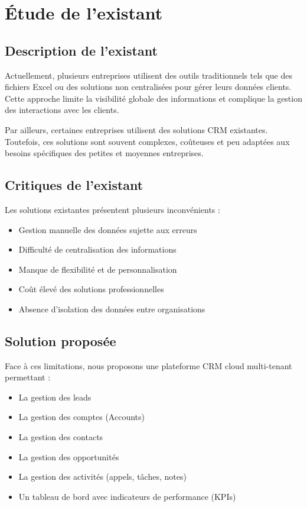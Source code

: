 \documentclass[12pt,a4paper]{report}
\begin{document}
\section{Étude de l’existant}

\subsection{Description de l’existant}

Actuellement, plusieurs entreprises utilisent des outils traditionnels tels que des fichiers Excel ou des solutions non centralisées pour gérer leurs données clients. Cette approche limite la visibilité globale des informations et complique la gestion des interactions avec les clients.

Par ailleurs, certaines entreprises utilisent des solutions CRM existantes. Toutefois, ces solutions sont souvent complexes, coûteuses et peu adaptées aux besoins spécifiques des petites et moyennes entreprises.

\subsection{Critiques de l’existant}

Les solutions existantes présentent plusieurs inconvénients :

\begin{itemize}
\item Gestion manuelle des données sujette aux erreurs
\item Difficulté de centralisation des informations
\item Manque de flexibilité et de personnalisation
\item Coût élevé des solutions professionnelles
\item Absence d’isolation des données entre organisations
\end{itemize}

\subsection{Solution proposée}

Face à ces limitations, nous proposons une plateforme CRM cloud multi-tenant permettant :

\begin{itemize}
\item La gestion des leads
\item La gestion des comptes (Accounts)
\item La gestion des contacts
\item La gestion des opportunités
\item La gestion des activités (appels, tâches, notes)
\item Un tableau de bord avec indicateurs de performance (KPIs)
\end{itemize}
\end{document}
